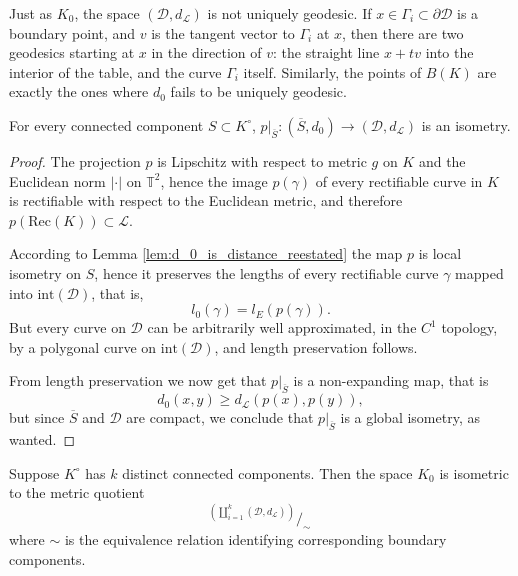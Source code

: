 \documentclass[reqno,11pt]{amsart}
\begin{document}
\begin{remark}
    Just as \(K_0\), the space \((\mathcal{D}, d_\mathcal{L})\) is not uniquely geodesic.
    If \(x \in \Gamma_i \subset \partial\mathcal{D}\) is a boundary point, and \(v\) is the tangent vector to \(\Gamma_i\) at \(x\), then there are two geodesics starting at \(x\) in the direction of \(v\): the straight line \(x + tv\) into the interior of the table, and the curve \(\Gamma_i\) itself.
    Similarly, the points of \(B(K)\) are exactly the ones where \(d_0\) fails to be uniquely geodesic.
\end{remark}
\begin{lemma}\label{lem:sheet_isometry}
    For every connected component \( S \subset K^\circ \), \( p\rvert_{\overline{S}}\colon (\overline S, d_0) \to (\mathcal{D}, d_\mathcal{L}) \) is an isometry.
\end{lemma}
\begin{proof}
    The projection \( p \) is Lipschitz with respect to metric \( g\) on \(K\) and the Euclidean norm \(|\cdot| \) on \(\mathbb{T}^2\), hence the image \( p(\gamma) \) of every rectifiable curve in \( K \) is rectifiable with respect to the Euclidean metric, and therefore \( p(\mathrm{Rec}(K)) \subset \mathcal{L} \).
    \par According to Lemma \ref{lem:d_0_is_distance_reestated} the map \( p \) is local isometry on \( S \), hence it preserves the lengths of every rectifiable curve \( \gamma \) mapped into \( \mathrm{int}(\mathcal{D}) \), that is, 
    \[ 
        l_0(\gamma) = l_E(p(\gamma)).
    \]
    But every curve on \( \mathcal{D} \) can be arbitrarily well approximated, in the \(C^1 \) topology, by a polygonal curve on \( \mathrm{int}(\mathcal{D}) \), and length preservation follows.
    \par From length preservation we now get that \( p\rvert_{\overline S} \) is a non-expanding map, that is
    \[
        d_0(x, y) \geq d_\mathcal{L}(p(x), p(y)), 
    \]
    but since \( \overline{S} \) and \( \mathcal{D} \) are compact, we conclude that \( p\rvert_{\overline S} \) is a global isometry, as wanted.     
\end{proof}
\begin{theorem}\label{thm:K_0_as_gluing_metric_space}
    Suppose \( K^\circ \) has \( k \) distinct connected components. Then the space \( K_0 \) is isometric to the metric quotient 
    \[
        ^{\textstyle \left(\displaystyle{\coprod_{i=1}^k}(\mathcal{D}, d_\mathcal{L})\right)}\!\!\!\Big/_{\!\!\textstyle\sim \ }
    \]
    where \( \sim \) is the equivalence relation identifying corresponding boundary components.
\end{theorem}
\end{document}
